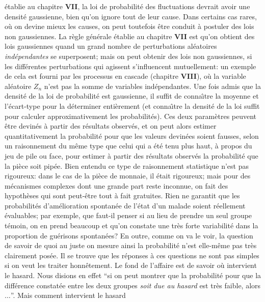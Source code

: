 \'etablie au chapitre {\bf VII},  la loi de probabilit\'e des fluctuations 
devrait avoir une densit\'e gaussienne, bien qu'on ignore tout de leur 
cause. Dans certains cas rares, o\`u on devine mieux les causes, on peut 
toutefois \^etre conduit \`a postuler des lois non gaussiennes.  La r\`egle 
g\'en\'erale \'etablie au chapitre {\bf VII} est qu'on obtient des lois 
gaussiennes quand un grand nombre de perturbations al\'eatoires {\it 
ind\'ependantes} se superposent; mais on peut obtenir des lois non 
gaussiennes, si les diff\'erentes perturbations qui agissent 
s'influencent mutuellement: un exemple de cela est fourni par 
les processus en cascade (chapitre {\bf VIII}), o\`u la variable
al\'eatoire $Z_n$ n'est pas la somme de variables ind\'ependantes. 
\medskip
Une fois admis que la densit\'e de la loi de probabilit\'e est gaussienne, 
il suffit de conna{\^\i}tre la moyenne et l'\'ecart-type pour la 
d\'eterminer enti\`erement (et conna{\^\i}tre la densit\'e de la loi suffit 
pour calculer approximativement les probabilit\'es). Ces deux 
param\`etres peuvent \^etre devin\'es \`a partir des r\'esultats 
observ\'es, et on peut alors estimer quantitativement la probabilit\'e 
pour que les valeurs devin\'ees soient fausses, selon un raisonnement du 
m\^eme type que celui qui a \'et\'e tenu plus haut, \`a propos du jeu de 
pile ou face, pour estimer \`a partir des r\'esultats observ\'es la 
probabilit\'e que la pi\`ece soit pip\'ee. 
\medskip 
Bien entendu ce type de raisonnement statistique n'est pas 
rigoureux: dans le cas de la pi\`ece de monnaie, il \'etait rigoureux; mais
pour des m\'ecanismes complexes dont une grande part reste inconnue, 
on fait des hypoth\`eses qui sont peut-\^etre tout \`a fait gratuites. 
Rien ne garantit que les probabilit\'es d'am\'elioration spontan\'ee de 
l'\'etat d'un malade soient r\'eellement \'evaluables;  par exemple, que 
faut-il penser si au lieu de prendre un seul groupe t\'emoin, on en prend 
beaucoup et qu'on constate une tr\`es forte variabilit\'e dans la 
proportion de gu\'erisons spontan\'ees?  En outre, comme on va le voir, 
la question de savoir de quoi au juste on mesure ainsi la probabilit\'e 
n'est elle-m\^eme pas tr\`es clairement pos\'ee. 
\medskip
Il se trouve que les r\'eponses \`a ces questions 
ne sont pas simples si on veut les traiter honn\^etement. 
Le fond de l'affaire est de savoir o\`u intervient le hasard. Nous
disions en effet ``si on peut montrer que la probabilit\'e pour que la 
diff\'erence constat\'ee entre les deux groupes {\it soit due au hasard} 
est tr\`es faible, alors $\ldots$''. Mais comment intervient le hasard 
